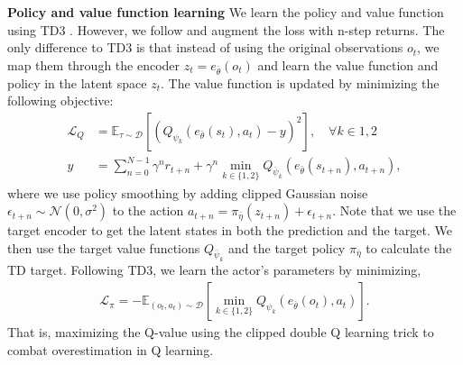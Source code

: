 \documentclass{article}
\theoremstyle{plain}
\theoremstyle{definition}
\theoremstyle{remark}
\newcommand{\E}{\mathbb{E}}
\begin{document}
\textbf{Policy and value function learning}
We learn the policy and value function using TD3 \citep{fujimotoAddressingFunctionApproximation2018}.
However, we follow \citet{yaratsMasteringVisualContinuous2021,zhaoSimplifiedTemporalConsistency2023}
and augment the loss with n-step returns.
The only difference to TD3 is that instead of using the original observations $o_{t}$, we map them through the
encoder $z_{t} = e_{\bar{\theta}}(o_{t})$ and learn the value function and policy in the latent space $z_{t}$.
The value function is updated by minimizing the following objective:
\begin{align} \label{eq:value-loss}
  \mathcal{L}_{Q} &= \E_{\tau \sim \mathcal{D}} \left[ (Q_{\psi_{k}}(e_{\bar{\theta}}(s_{t}), a_{t}) - y)^{2}  \right], \quad  \forall k \in 1, 2 \\
  y &= \sum_{n=0}^{N-1} \gamma^{n} r_{t+n} + \gamma^{n} \min_{k \in \{1,2\}} Q_{\bar{\psi}_{k}}(e_{\bar{\theta}}(s_{t+n}), a_{t+n}), \nonumber
\end{align}
where we use policy smoothing by adding clipped Gaussian noise $\epsilon_{t+n} \sim \mathcal{N} (0,\sigma^{2})$ to the
action $a_{t+n} = \pi_{\bar{\eta}}(z_{t+n}) + \epsilon_{t+n}$.
Note that we use the target encoder to get the latent states in both the prediction and the target.
We then use the target value functions $Q_{\bar{\psi}_{k}}$ and the target policy $\pi_{\bar{\eta}}$ to calculate the TD target.
Following TD3, we learn the actor's parameters by minimizing,
%
\begin{align} \label{eq:policy-loss}
 \mathcal{L}_{\pi} = - \E_{(o_{t}, a_{t}) \sim \mathcal{D}} \left[ \min_{k\in\{1,2\}} Q_{\psi_{k}}(e_{\bar{\theta}}(o_{t}), a_{t}) \right].
\end{align}
%
That is, maximizing the Q-value using the clipped double Q learning trick to combat overestimation in Q learning.

\end{document}
